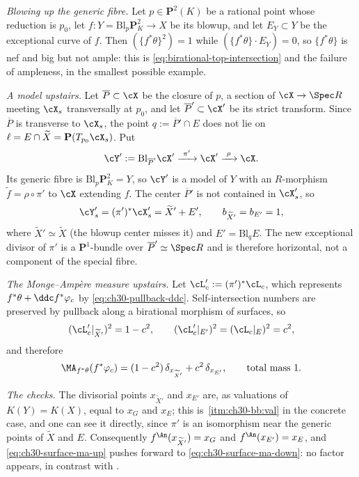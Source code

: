 \begin{example}
\emph{Blowing up the generic fibre.}  Let \(p\in\mathbf P^2(K)\) be a
rational point whose reduction is \(p_0\), let
\(f:Y=\mathrm{Bl}_p\mathbf P^2_K\to X\) be its blowup, and let
\(E_Y\subset Y\) be the exceptional curve of \(f\).  Then
\((\{f^*\theta\}^2)=1\) while \((\{f^*\theta\}\cdot E_Y)=0\), so
\(\{f^*\theta\}\) is nef and big but not ample: this is
\eqref{eq:birational-top-intersection} and the failure of ampleness, in the
smallest possible example.

\emph{A model upstairs.}  Let \(\overline P\subset\cX\) be the closure of
\(p\), a section of \(\cX\to\Spec R\) meeting \(\cX_s\) transversally at
\(p_0\), and let \(\overline P'\subset\cX'\) be its strict transform.  Since
\(\overline P\) is transverse to \(\cX_s\), the point
\(q:=\overline P'\cap E\) does not lie on
\(\ell=E\cap\widetilde X=\mathbf P(T_{p_0}\cX_s)\).  Put
\[
 \cY':=\mathrm{Bl}_{\overline P'}\cX'
 \xrightarrow{\ \pi'\ }\cX'\xrightarrow{\ \rho\ }\cX .
\]
Its generic fibre is \(\mathrm{Bl}_p\mathbf P^2_K=Y\), so \(\cY'\) is a
model of \(Y\) with an \(R\)-morphism \(\tilde f=\rho\circ\pi'\) to \(\cX\)
extending \(f\).  The center \(\overline P'\) is not contained in
\(\cX'_s\), so
\[
 \cY'_s=(\pi')^*\cX'_s=\widetilde X'+E',
 \qquad b_{\widetilde X'}=b_{E'}=1,
\]
where \(\widetilde X'\simeq\widetilde X\) (the blowup center misses it) and
\(E'=\mathrm{Bl}_q E\).  The new exceptional divisor of \(\pi'\) is a
\(\mathbf P^1\)-bundle over \(\overline P'\simeq\Spec R\) and is therefore
horizontal, not a component of the special fibre.

\emph{The Monge--Amp\`ere measure upstairs.}  Let
\(\cL'_c:=(\pi')^*\cL_c\), which represents
\(f^*\theta+\ddc f^*\varphi_c\) by
\eqref{eq:ch30-pullback-ddc}.  Self-intersection numbers are preserved by
pullback along a birational morphism of surfaces, so
\[
 (\cL'_c|_{\widetilde X'})^2=1-c^2,
 \qquad
 (\cL'_c|_{E'})^2=(\cL_c|_E)^2=c^2 ,
\]
and therefore
\begin{equation}
\label{eq:ch30-surface-ma-up}
 \MA_{f^*\theta}(f^*\varphi_c)
 =(1-c^2)\,\delta_{x_{\widetilde X'}}+c^2\,\delta_{x_{E'}},
 \qquad
 \text{total mass}\ 1 .
\end{equation}

\emph{The checks.}  The divisorial points \(x_{\widetilde X'}\) and
\(x_{E'}\) are, as valuations of \(K(Y)=K(X)\), equal to \(x_G\) and
\(x_E\); this is
\,\cref{itm:ch30-bb:val} in the concrete
case, and one can see it directly, since \(\pi'\) is an isomorphism near the
generic points of \(\widetilde X\) and \(E\).  Consequently
\(f^{\An}(x_{\widetilde X'})=x_G\) and \(f^{\An}(x_{E'})=x_E\), and
\eqref{eq:ch30-surface-ma-up} pushes forward to
\eqref{eq:ch30-surface-ma-down}: no factor appears, in contrast with
.


\end{example}
